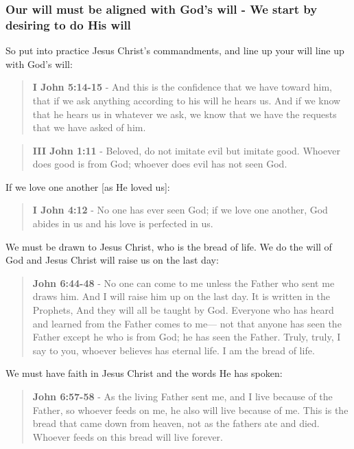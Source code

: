 \documentclass[11pt]{article}
\begin{document}
\subsubsection{Our will must be aligned with God's will - We start by desiring to do His will}
\label{sec:org9c1c69c}
So put into practice Jesus Christ's commandments, and line up your will line up with God's will:

\begin{quote}
\textbf{I John 5:14-15} - And this is the confidence that we have toward him, that if we ask anything according to his will he hears us. And if we know that he hears us in whatever we ask, we know that we have the requests that we have asked of him.
\end{quote}

\begin{quote}
\textbf{III John 1:11} - Beloved, do not imitate evil but imitate good. Whoever does good is from God; whoever does evil has not seen God.
\end{quote}

If we love one another [as He loved us]:

\begin{quote}
\textbf{I John 4:12} - No one has ever seen God; if we love one another, God abides in us and his love is perfected in us.
\end{quote}

We must be drawn to Jesus Christ, who is the bread of life. We do the will of God and Jesus Christ will raise us on the last day:

\begin{quote}
\textbf{John 6:44-48} - No one can come to me unless the Father who sent me draws him. And I will raise him up on the last day. It is written in the Prophets, And they will all be taught by God. Everyone who has heard and learned from the Father comes to me— not that anyone has seen the Father except he who is from God; he has seen the Father. Truly, truly, I say to you, whoever believes has eternal life. I am the bread of life.
\end{quote}

We must have faith in Jesus Christ and the words He has spoken:

\begin{quote}
\textbf{John 6:57-58} - As the living Father sent me, and I live because of the Father, so whoever feeds on me, he also will live because of me. This is the bread that came down from heaven, not as the fathers ate and died. Whoever feeds on this bread will live forever.
\end{quote}
\end{document}
